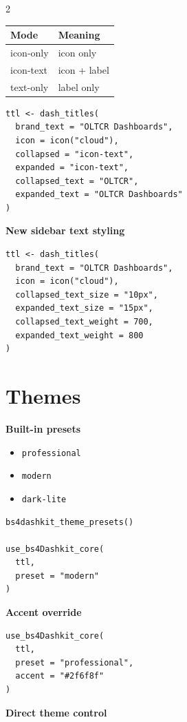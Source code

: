\documentclass[10pt]{article}
\begin{document}
\begin{multicols}{2}
\begin{tabular}{>{\ttfamily}l l}
\toprule
Mode & Meaning \\
\midrule
icon-only & icon only \\
icon-text & icon + label \\
text-only & label only \\
\bottomrule
\end{tabular}

\begin{lstlisting}[style=rstyle]
ttl <- dash_titles(
  brand_text = "OLTCR Dashboards",
  icon = icon("cloud"),
  collapsed = "icon-text",
  expanded = "icon-text",
  collapsed_text = "OLTCR",
  expanded_text = "OLTCR Dashboards"
)
\end{lstlisting}

\textbf{New sidebar text styling}

\begin{lstlisting}[style=rstyle]
ttl <- dash_titles(
  brand_text = "OLTCR Dashboards",
  icon = icon("cloud"),
  collapsed_text_size = "10px",
  expanded_text_size = "15px",
  collapsed_text_weight = 700,
  expanded_text_weight = 800
)
\end{lstlisting}

\columnbreak

\section*{Themes}

\textbf{Built-in presets}
\begin{itemize}
  \item \texttt{professional}
  \item \texttt{modern}
  \item \texttt{dark-lite}
\end{itemize}

\begin{lstlisting}[style=rstyle]
bs4dashkit_theme_presets()

use_bs4Dashkit_core(
  ttl,
  preset = "modern"
)
\end{lstlisting}

\textbf{Accent override}

\begin{lstlisting}[style=rstyle]
use_bs4Dashkit_core(
  ttl,
  preset = "professional",
  accent = "#2f6f8f"
)
\end{lstlisting}

\textbf{Direct theme control}


\end{multicols}
\end{document}
